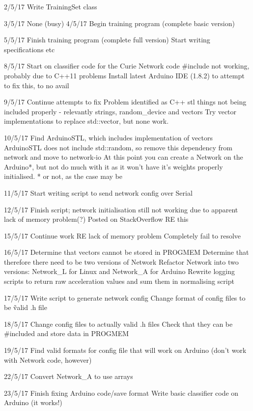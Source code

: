 \documentclass[a4paper]{article}
\begin{document}
2/5/17
    Write TrainingSet class

3/5/17
    None (busy)
4/5/17
    Begin training program (complete basic version)

5/5/17
    Finish training program (complete full version)
    Start writing specifications etc

8/5/17
    Start on classifier code for the Curie
        Network code \#include not working, probably due to C++11 problems
    Install latest Arduino IDE (1.8.2) to attempt to fix this, to no avail

9/5/17
    Continue attempts to fix
    Problem identified as C++ stl things not being included properly - relevantly strings, random\_device and vectors
    Try vector implementations to replace std::vector, but none work.

10/5/17
    Find ArduinoSTL, which includes implementation of vectors
    ArduinoSTL does not include std::random, so remove this dependency from network and move to network-io
    At this point you can create a Network on the Arduino*, but not do much with it as it won't have it's weights properly initialised.
        * or not, as the case may be

11/5/17
    Start writing script to send network config over Serial

12/5/17
    Finish script; network initialisation still not working due to apparent lack of memory problem(?)
        Posted on StackOverflow RE this

15/5/17
    Continue work RE lack of memory problem
    Completely fail to resolve

16/5/17
    Determine that vectors cannot be stored in PROGMEM
    Determine that therefore there need to be two versions of Network
    Refactor Network into two versions: Network\_L for Linux and Network\_A for Arduino
    Rewrite logging scripts to return raw acceleration values and sum them in normalising script

17/5/17
    Write script to generate network config
    Change format of config files to be \~valid .h file

18/5/17
    Change config files to actually valid .h files 
    Check that they can be \#included and store data in PROGMEM

19/5/17
    Find valid formats for config file that will work on Arduino
        (don't work with Network code, however)

22/5/17
    Convert Network\_A to use arrays
     
23/5/17
    Finish fixing Arduino code/save format
    Write basic classifier code on Arduino (it works!)
\end{document}
